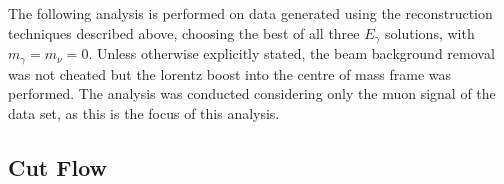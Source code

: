 The following analysis is performed on data generated using the reconstruction techniques described above, choosing the best of all three ${E}_{\gamma}$ solutions, with  ${m}_{\gamma} = {m}_{\nu} = 0$. Unless otherwise explicitly stated, the beam background removal was not cheated but the lorentz boost into the centre of mass frame was performed. The analysis was conducted considering only the muon signal of the data set, as this is the focus of this analysis.
\subsection{Cut Flow}
\label{SUBSEC:CutFlow}

